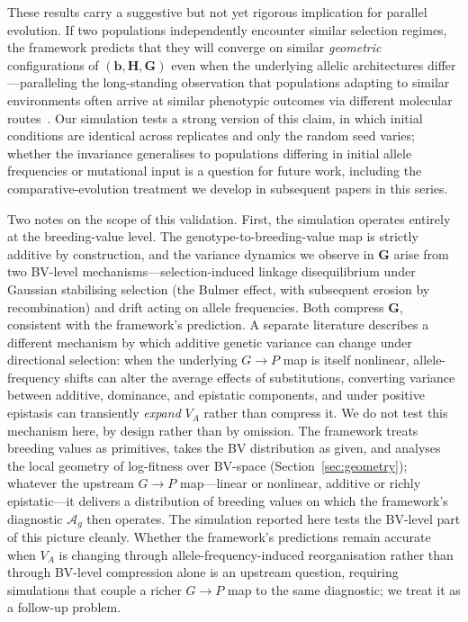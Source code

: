 \documentclass[9pt,twocolumn,twoside,lineno]{gsajnl}
\newcommand{\vect}[1]{\boldsymbol{#1}}
\newcommand{\mat}[1]{\mathbf{#1}}
\newcommand{\Ag}{\ensuremath{\mathcal{A}_{g}}\xspace}
\begin{document}
These results carry a suggestive but not yet rigorous implication for parallel evolution. If two populations independently encounter similar selection regimes, the framework predicts that they will converge on similar \emph{geometric} configurations of $(\vect{b},\mat{H},\mat{G})$ even when the underlying allelic architectures differ---paralleling the long-standing observation that populations adapting to similar environments often arrive at similar phenotypic outcomes via different molecular routes~\citep{Schluter1996,Stern2013}. Our simulation tests a strong version of this claim, in which initial conditions are identical across replicates and only the random seed varies; whether the invariance generalises to populations differing in initial allele frequencies or mutational input is a question for future work, including the comparative-evolution treatment we develop in subsequent papers in this series.

Two notes on the scope of this validation. First, the simulation operates entirely at the breeding-value level. The genotype-to-breeding-value map is strictly additive by construction, and the variance dynamics we observe in $\mat{G}$ arise from two BV-level mechanisms---selection-induced linkage disequilibrium under Gaussian stabilising selection (the Bulmer effect, with subsequent erosion by recombination) and drift acting on allele frequencies. Both compress $\mat{G}$, consistent with the framework's prediction. A separate literature \citep{CheverudRoutman1995,Hansen2006,Hansen2013,CarterHermissonHansen2005} describes a different mechanism by which additive genetic variance can change under directional selection: when the underlying $G\!\to\!P$ map is itself nonlinear, allele-frequency shifts can alter the average effects of substitutions, converting variance between additive, dominance, and epistatic components, and under positive epistasis can transiently \emph{expand} $V_A$ rather than compress it. We do not test this mechanism here, by design rather than by omission. The framework treats breeding values as primitives, takes the BV distribution as given, and analyses the local geometry of log-fitness over BV-space (Section~\ref{sec:geometry}); whatever the upstream $G\!\to\!P$ map---linear or nonlinear, additive or richly epistatic---it delivers a distribution of breeding values on which the framework's diagnostic $\Ag$ then operates. The simulation reported here tests the BV-level part of this picture cleanly. Whether the framework's predictions remain accurate when $V_A$ is changing through allele-frequency-induced reorganisation rather than through BV-level compression alone is an upstream question, requiring simulations that couple a richer $G\!\to\!P$ map to the same diagnostic; we treat it as a follow-up problem.
\end{document}
